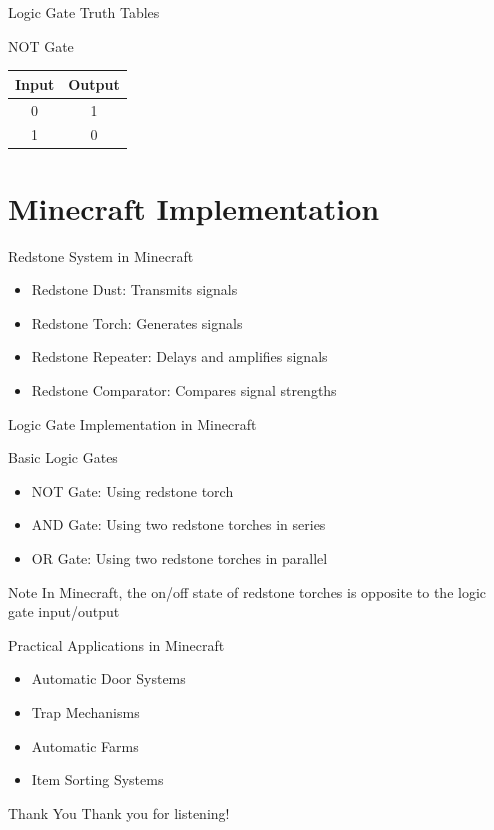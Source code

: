 \documentclass{beamer}
\begin{document}
\begin{frame}{Logic Gate Truth Tables}
    \begin{block}{NOT Gate}
        \begin{tabular}{|c|c|}
            \hline
            Input & Output \\
            \hline
            0 & 1 \\
            1 & 0 \\
            \hline
        \end{tabular}
    \end{block}
\end{frame}

\section{Minecraft Implementation}
\begin{frame}{Redstone System in Minecraft}
    \begin{itemize}
        \item Redstone Dust: Transmits signals
        \item Redstone Torch: Generates signals
        \item Redstone Repeater: Delays and amplifies signals
        \item Redstone Comparator: Compares signal strengths
    \end{itemize}
\end{frame}

\begin{frame}{Logic Gate Implementation in Minecraft}
    \begin{block}{Basic Logic Gates}
        \begin{itemize}
            \item NOT Gate: Using redstone torch
            \item AND Gate: Using two redstone torches in series
            \item OR Gate: Using two redstone torches in parallel
        \end{itemize}
    \end{block}
    
    \begin{alertblock}{Note}
        In Minecraft, the on/off state of redstone torches is opposite to the logic gate input/output
    \end{alertblock}
\end{frame}

\begin{frame}{Practical Applications in Minecraft}
    \begin{itemize}
        \item Automatic Door Systems
        \item Trap Mechanisms
        \item Automatic Farms
        \item Item Sorting Systems
    \end{itemize}
\end{frame}

\begin{frame}{Thank You}
    \centering
    Thank you for listening!
\end{frame}
\end{document}
